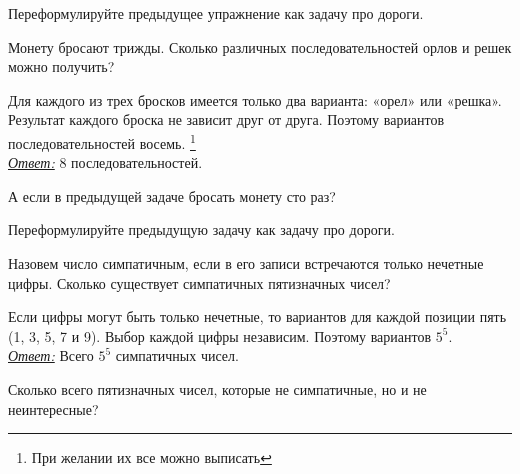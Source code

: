 \begin{ex}\label{u16}
	Переформулируйте предыдущее упражнение как задачу про дороги. 
\end{ex}

\begin{thm}
	Монету бросают трижды. Сколько различных последовательностей орлов и решек можно получить? 
\end{thm}

\begin{prf}
	Для каждого из трех бросков имеется только два варианта: «орел» или «решка». Результат каждого броска не зависит друг от друга. Поэтому вариантов последовательностей восемь. \footnote{При желании их все можно выписать}\\ \underline{\textit{Ответ:}} 8 последовательностей.
\end{prf}

\begin{ex}\label{u17}
	А если в предыдущей задаче бросать монету сто раз?
\end{ex}

\begin{ex}\label{u18}
	Переформулируйте предыдущую задачу как задачу про дороги. 
\end{ex}

\begin{thm}Назовем число симпатичным, если в его записи встречаются только нечетные цифры. Сколько существует симпатичных пятизначных чисел?
\end{thm}

\begin{prf}
	Если цифры могут быть только нечетные, то вариантов для каждой позиции пять (1, 3, 5, 7 и 9). Выбор каждой цифры независим. Поэтому вариантов $5^5$.\\ \textit{\underline{Ответ:}} Всего $5^5$ симпатичных чисел.
\end{prf}

\begin{thm}
	Сколько всего пятизначных чисел, которые не симпатичные, но и не неинтересные?
\end{thm}

